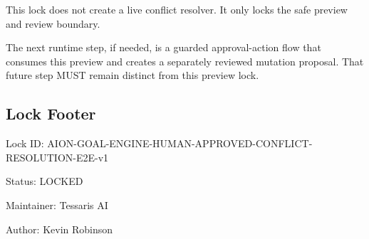 This lock does not create a live conflict resolver. It only locks the safe preview and review boundary.

The next runtime step, if needed, is a guarded approval-action flow that consumes this preview and creates a separately reviewed mutation proposal. That future step MUST remain distinct from this preview lock.

\subsection{Lock Footer}

Lock ID: AION-GOAL-ENGINE-HUMAN-APPROVED-CONFLICT-RESOLUTION-E2E-v1

Status: LOCKED

Maintainer: Tessaris AI

Author: Kevin Robinson
